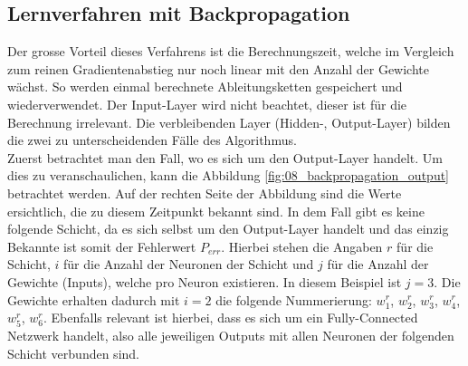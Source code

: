 \newpage
\subsection{Lernverfahren mit Backpropagation}
Der grosse Vorteil dieses Verfahrens ist die Berechnungszeit, welche im Vergleich zum reinen Gradientenabstieg nur noch
linear mit den Anzahl der Gewichte wächst. So werden einmal berechnete Ableitungsketten gespeichert und wiederverwendet.
Der Input-Layer wird nicht beachtet, dieser ist für die Berechnung irrelevant. Die verbleibenden Layer (Hidden-, Output-Layer)
bilden die zwei zu unterscheidenden Fälle des Algorithmus.
\\

Zuerst betrachtet man den Fall, wo es sich um den Output-Layer handelt. Um dies zu veranschaulichen, kann
die Abbildung \ref{fig:08_backpropagation_output} betrachtet werden. Auf der rechten Seite der Abbildung sind die Werte ersichtlich,
die zu diesem Zeitpunkt bekannt sind. In dem Fall gibt es keine folgende Schicht, da es sich selbst um den Output-Layer
handelt und das einzig Bekannte ist somit der Fehlerwert $P_{err}$. Hierbei stehen die Angaben $r$ für die Schicht,
$i$ für die Anzahl der Neuronen der Schicht und $j$ für die Anzahl der Gewichte (Inputs), welche pro Neuron existieren.
In diesem Beispiel ist $j = 3$. Die Gewichte erhalten dadurch mit $i = 2$ die folgende Nummerierung:
$w_1^r$, $w_2^r$, $w_3^r$, $w_4^r$, $w_5^r$, $w_6^r$. Ebenfalls relevant ist hierbei, dass es sich um ein Fully-Connected
Netzwerk handelt, also alle jeweiligen Outputs mit allen Neuronen der folgenden Schicht verbunden sind.


